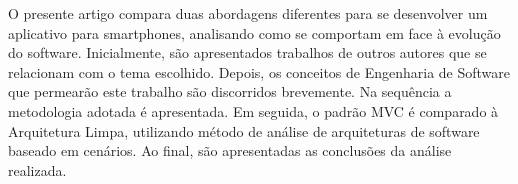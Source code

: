 O presente artigo compara duas abordagens diferentes para se desenvolver um aplicativo para smartphones, analisando como se comportam em face à evolução do software.
Inicialmente, são apresentados trabalhos de outros autores que se relacionam com o tema escolhido.
Depois, os conceitos de Engenharia de Software que permearão este trabalho são discorridos brevemente.
Na sequência a metodologia adotada é apresentada.
Em seguida, o padrão MVC é comparado à Arquitetura Limpa, utilizando método de análise de arquiteturas de software baseado em cenários.
Ao final, são apresentadas as conclusões da análise realizada.